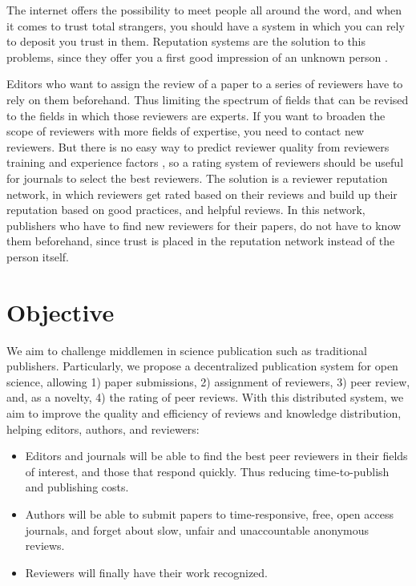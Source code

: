 The internet offers the possibility to meet people all around the word, and when
it comes to trust total strangers, you should have a system in which you can
rely to deposit you trust in them. Reputation systems are the solution to this
problems, since they offer you a first good impression of an unknown person
\cite{resnick2000reputation}.

Editors who want to assign the review of a paper to a series of reviewers have
to rely on them beforehand. Thus limiting the spectrum of fields that can be
revised to the fields in which those reviewers are experts. If you want to
broaden the scope of reviewers with more fields of expertise, you need to
contact new reviewers. But there is no easy way to predict reviewer quality from
reviewers training and experience factors \cite{callaham_relationship_2007}, so
a rating system of reviewers should be useful for journals to select the best
reviewers. The solution is a reviewer reputation network, in which reviewers get
rated based on their reviews and build up their reputation based on good
practices, and helpful reviews. In this network, publishers who have to find new
reviewers for their papers, do not have to know them beforehand, since trust is
placed in the reputation network instead of the person itself.

\section{Objective}

We aim to challenge middlemen in science publication such as traditional
publishers. Particularly, we propose a decentralized publication system for open
science, allowing 1) paper submissions, 2) assignment of reviewers, 3) peer
review, and, as a novelty, 4) the rating of peer reviews. With this distributed
system, we aim to improve the quality and efficiency of reviews and knowledge
distribution, helping editors, authors, and reviewers:
\begin{itemize}
  \item Editors and journals will be able to find the best peer reviewers in
    their fields of interest, and those that respond quickly.  Thus reducing time-to-publish and publishing costs.
  \item Authors will be able to submit papers to time-responsive, free, open access
      journals, and forget about slow, unfair and unaccountable anonymous reviews.
  \item Reviewers will finally have their work recognized.
 \end{itemize}

